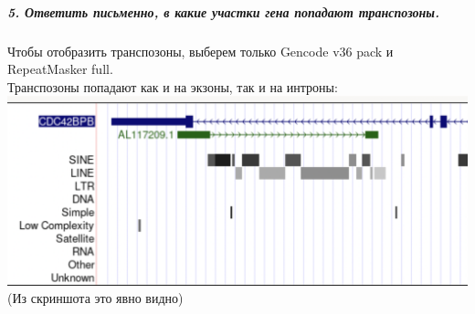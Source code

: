 \documentclass[12pt]{article}
\begin{document}
\subparagraph{5. Ответить письменно, в какие участки гена попадают транспозоны.\\}
Чтобы отобразить транспозоны, выберем только Gencode v36 pack и RepeatMasker full.\\
Транспозоны попадают как и на экзоны, так и на интроны:\\
\includegraphics[width=15cm]{image/image19.png}\\
(Из скриншота это явно видно)
\end{document}
